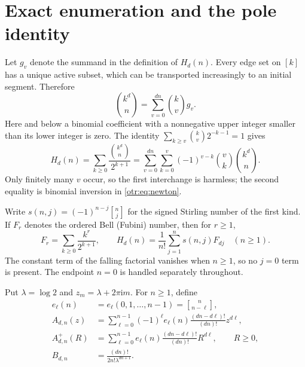 \documentclass[11pt,a4paper]{article}
\theoremstyle{definition}\newtheorem{definition}[theorem]{Definition}
\theoremstyle{remark}\newtheorem{remark}[theorem]{Remark}
\newcommand{\lam}{\lambda}
\newcommand{\ii}{\mathrm i}
\newcommand{\St}[2]{\genfrac{[}{]}{0pt}{}{#1}{#2}}
\begin{document}
\section{Exact enumeration and the pole identity}
\label{otr:sec:exact}
Let $g_v$ denote the summand in the definition of $H_d(n)$. Every edge set on $[k]$ has a unique active subset, which can be transported increasingly to an initial segment. Therefore
\begin{equation}\label{otr:eq:newton}
 \binom{k^d}{n}=\sum_{v=0}^{dn}\binom{k}{v}g_v.
\end{equation}
Here and below a binomial coefficient with a nonnegative upper integer smaller than its lower integer is zero. The identity
$\sum_{k\ge v}\binom{k}{v}2^{-k-1}=1$ gives
\begin{equation}\label{otr:eq:enum}
 H_d(n)=\sum_{k\ge0}\frac{\binom{k^d}{n}}{2^{k+1}}
 =\sum_{v=0}^{dn}\sum_{k=0}^{v}(-1)^{v-k}\binom vk\binom{k^d}{n}.
\end{equation}
Only finitely many $v$ occur, so the first interchange is harmless; the second equality is binomial inversion in \eqref{otr:eq:newton}.

Write $s(n,j)=(-1)^{n-j}\St nj$ for the signed Stirling number of the first kind. If $F_r$ denotes the ordered Bell (Fubini) number, then for $r\ge1$,
\[
 F_r=\sum_{k\ge0}\frac{k^r}{2^{k+1}},\qquad
 H_d(n)=\frac1{n!}\sum_{j=1}^{n}s(n,j)F_{dj}\quad(n\ge1).
\]
The constant term of the falling factorial vanishes when $n\ge1$, so no $j=0$ term is present. The endpoint $n=0$ is handled separately throughout.

Put $\lam=\log2$ and $z_m=\lam+2\pi\ii m$. For $n\ge1$, define
\begin{align}
 e_\ell(n)&=e_\ell(0,1,\ldots,n-1)=\St n{n-\ell},\nonumber\\
 A_{d,n}(z)&=\sum_{\ell=0}^{n-1}(-1)^\ell e_\ell(n)
              \frac{(dn-d\ell)!}{(dn)!}z^{d\ell},\label{otr:eq:amplitude}\\
 A^+_{d,n}(R)&=\sum_{\ell=0}^{n-1}e_\ell(n)
              \frac{(dn-d\ell)!}{(dn)!}R^{d\ell},\qquad R\ge0,\nonumber\\
 B_{d,n}&=\frac{(dn)!}{2n!\lam^{dn+1}}.\nonumber
\end{align}
\end{document}
